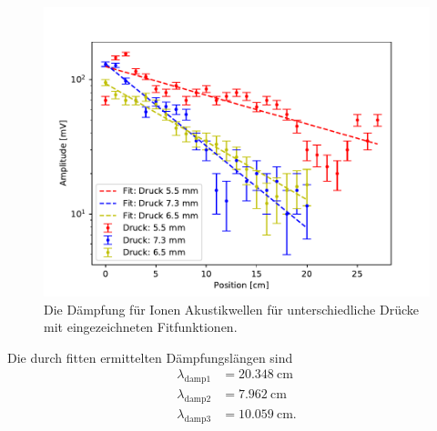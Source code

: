 \begin{figure}[H]
\centering
\includegraphics[scale=0.6]{3_3_Daempfung.pdf}
\caption{Die Dämpfung für Ionen Akustikwellen für unterschiedliche Drücke mit eingezeichneten Fitfunktionen.}
\label{fig:3_3_Daempfung}
\end{figure}
Die durch fitten ermittelten Dämpfungslängen sind
\begin{align}
  \lambda_{\mathrm{damp} 1} &= 20.348\ \mathrm{cm} \\
  \lambda_{\mathrm{damp} 2} &=  7.962\  \mathrm{cm} \\
  \lambda_{\mathrm{damp} 3} &= 10.059\  \mathrm{cm}. 
\end{align}  
